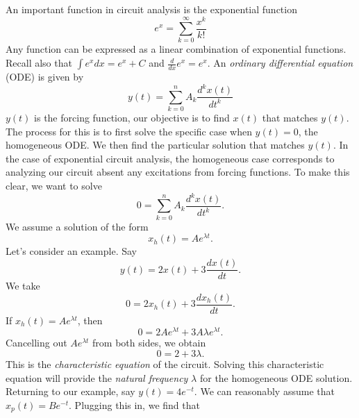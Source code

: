 \documentclass[nobib]{tufte-handout}
\begin{document}
An important function in circuit analysis 
is the exponential function 
\begin{equation} \label{eq:41}
    e^x = \sum_{k=0}^\infty \frac{x^k}{k!}
\end{equation}
Any function can be expressed as a linear 
combination of exponential functions. Recall 
also that $\int e^x dx = e^x + C$ and 
$\frac{d}{dx} e^x = e^x$. 
An \emph{ordinary differential equation} (ODE)
is given by 
\begin{equation} \label{eq:42}
    y(t) = \sum_{k=0}^{n} A_k \frac{d^k x(t)}{dt^k}
\end{equation}
$y(t)$ is the forcing function, our objective is 
to find $x(t)$ that matches $y(t)$. The process for 
this is to first solve the specific case 
when $y(t) = 0$, the homogeneous ODE. We then 
find the particular solution that matches $y(t)$. 
In the case of exponential circuit analysis, the homogeneous
case corresponds to analyzing our circuit absent 
any excitations from forcing functions. To make this clear,
we want to solve 
\begin{equation} \label{eq:43}
    0 = \sum_{k=0}^{n} A_k \frac{d^k x(t)}{dt^k}.
\end{equation}
We assume a solution of the form
\begin{equation} \label{eq:44}
    x_h(t) = Ae^{\lambda t}.
\end{equation}
Let's consider an example. Say 
\begin{equation}
    y(t) = 2x(t) + 3 \frac{dx(t)}{dt}.
\end{equation}
We take 
\begin{equation}
    0 = 2x_h(t) + 3 \frac{dx_h(t)}{dt}.
\end{equation}
If $x_h(t) = A e^{\lambda t}$, 
then 
\begin{equation}
    0 = 2A e^{\lambda t} + 3 A \lambda e^{\lambda t}.
\end{equation}
Cancelling out $Ae^{\lambda t}$ from 
both sides, we obtain 
\begin{equation}
    0 = 2 + 3 \lambda.
\end{equation}
This is the \emph{characteristic equation}
of the circuit. Solving this characteristic 
equation will provide the \emph{natural frequency}
$\lambda$ for the homogeneous ODE solution. 
Returning to our example, say 
$y(t) = 4e^{-t}$. We can reasonably 
assume that $x_p(t) = Be^{-t}$. 
Plugging this in, we find that 
\end{document}
